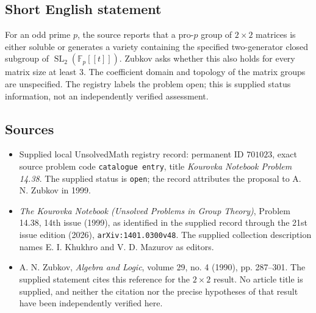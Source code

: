 \documentclass[11pt]{article}
\newcommand{\F}{\mathbb{F}}
\begin{document}
\subsection{Short English statement}
For an odd prime $p$, the source reports that a pro-$p$ group of $2\times2$ matrices is either soluble or generates a variety containing the specified two-generator closed subgroup of $\operatorname{SL}_2(\F_p[[t]])$. Zubkov asks whether this also holds for every matrix size at least $3$. The coefficient domain and topology of the matrix groups are unspecified. The registry labels the problem open; this is supplied status information, not an independently verified assessment.
\subsection{Sources}
\begin{itemize}
\item Supplied local UnsolvedMath registry record: permanent ID $701023$, exact source problem code \texttt{catalogue entry}, title \emph{Kourovka Notebook Problem 14.38}. The supplied status is \texttt{open}; the record attributes the proposal to A. N. Zubkov in 1999.
\item \emph{The Kourovka Notebook (Unsolved Problems in Group Theory)}, Problem 14.38, 14th issue (1999), as identified in the supplied record through the 21st issue edition (2026), \texttt{arXiv:1401.0300v48}. The supplied collection description names E. I. Khukhro and V. D. Mazurov as editors.
\item A. N. Zubkov, \emph{Algebra and Logic}, volume 29, no. 4 (1990), pp. 287--301. The supplied statement cites this reference for the $2\times2$ result. No article title is supplied, and neither the citation nor the precise hypotheses of that result have been independently verified here.
\end{itemize}
\end{document}

